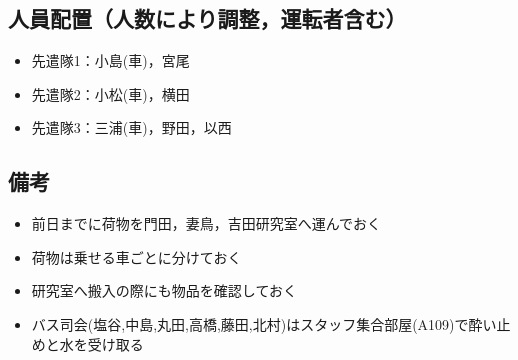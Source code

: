\subsection{人員配置（人数により調整，運転者含む）}
\begin{itemize}
\item 先遣隊1：小島(車)，宮尾
\item 先遣隊2：小松(車)，横田
\item 先遣隊3：三浦(車)，野田，以西

\end{itemize}

\subsection{備考}
\begin{itemize}
\item 前日までに荷物を門田，妻鳥，吉田研究室へ運んでおく
\item 荷物は乗せる車ごとに分けておく
\item 研究室へ搬入の際にも物品を確認しておく
\item バス司会(塩谷,中島,丸田,高橋,藤田,北村)はスタッフ集合部屋(A109)で酔い止めと水を受け取る
\end{itemize}


%
